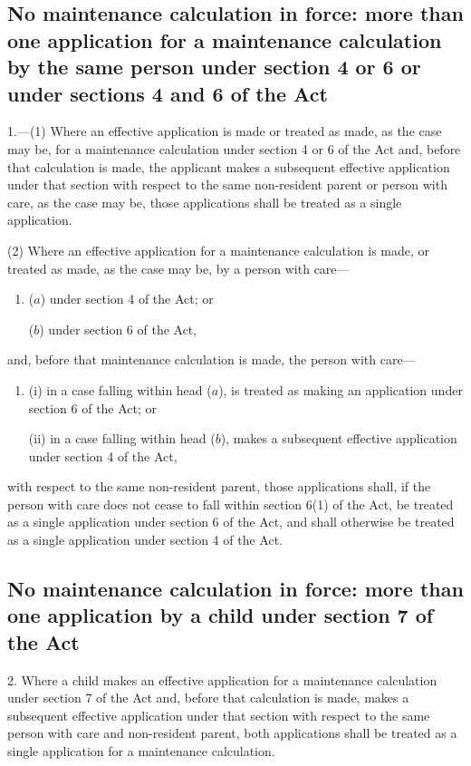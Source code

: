 \documentclass[12pt,a4paper]{article}
\begin{document}
\subsection*{No maintenance calculation in force: more than one application for a maintenance calculation by the same person under section 4 or 6 or under sections 4 and 6 of the Act}

1.---(1)  Where an effective application is made or treated as made, as the case may be, for a maintenance calculation under section 4 or 6 of the Act and, before that calculation is made, the applicant makes a subsequent effective application under that section with respect to the same non-resident parent or person with care, as the case may be, those applications shall be treated as a single application.

(2) Where an effective application for a maintenance calculation is made, or treated as made, as the case may be, by a person with care—
\begin{enumerate}\item[]
($a$) under section 4 of the Act; or

($b$) under section 6 of the Act,
\end{enumerate}
and, before that maintenance calculation is made, the person with care—
\begin{enumerate}\item[]
(i) in a case falling within head ($a$), is treated as making an application under section 6 of the Act; or

(ii) in a case falling within head ($b$), makes a subsequent effective application under section 4 of the Act,
\end{enumerate}
with respect to the same non-resident parent, those applications shall, if the person with care does not cease to fall within section 6(1) of the Act, be treated as a single application under section 6 of the Act, and shall otherwise be treated as a single application under section 4 of the Act.

\subsection*{No maintenance calculation in force: more than one application by a child under section 7 of the Act}

2.  Where a child makes an effective application for a maintenance calculation under section 7 of the Act and, before that calculation is made, makes a subsequent effective application under that section with respect to the same person with care and non-resident parent, both applications shall be treated as a single application for a maintenance calculation.
\end{document}
